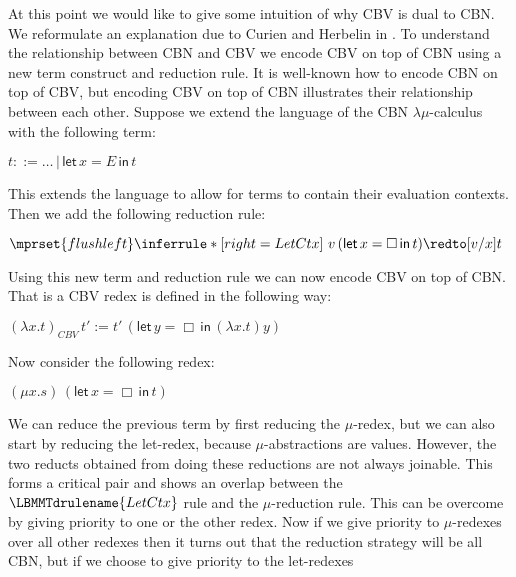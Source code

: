 At this point we would like to give some intuition of why CBV is dual
to CBN.  We reformulate an explanation due to Curien and Herbelin in
\cite{Curien:2000}.  To understand the relationship between CBN and
CBV we encode CBV on top of CBN using a new term construct and
reduction rule.  It is well-known how to encode CBN on top of CBV, but
encoding CBV on top of CBN illustrates their relationship between each
other.  Suppose we extend the language of the CBN
$\lambda\mu$-calculus with the following term:
\begin{center}
  \begin{math}
    t ::= \ldots\,|\,\textsf{let}\,x = E\,\textsf{in}\,t
  \end{math}
\end{center}
This extends the language to allow for terms to contain their evaluation
contexts.  Then we add the following reduction rule:
\begin{center}
  \begin{math}
    $$\mprset{flushleft}
    \inferrule* [right=LetCtx] {
      \ 
    }{v\,(\textsf{let}\,x = \Box\,\textsf{in}\,t) \redto [v/x]t}
  \end{math}
\end{center}
Using this new term and reduction rule we can now encode CBV on top
of CBN.  That is a CBV redex is defined in the following way:
\begin{center}
  \begin{math}
    (\lambda x.t)_{CBV}\,t' := t'\,(\textsf{let}\,y = \Box\,\textsf{in}\,(\lambda x.t) y)
  \end{math}
\end{center}
Now consider the following redex:
\begin{center}
  \begin{math}
    (\mu x.s)\,(\textsf{let}\,x = \Box\,\textsf{in}\,t)
  \end{math}
\end{center}
We can reduce the previous term by first reducing the $\mu$-redex, but
we can also start by reducing the let-redex, because
$\mu$-abstractions are values. However, the two reducts obtained from
doing these reductions are not always joinable.  This forms a critical
pair and shows an overlap between the $\LBMMTdrulename{LetCtx}$ rule
and the $\mu$-reduction rule.  This can be overcome by giving priority
to one or the other redex.  Now if we give priority to $\mu$-redexes
over all other redexes then it turns out that the reduction strategy
will be all CBN, but if we choose to give priority to the let-redexes
